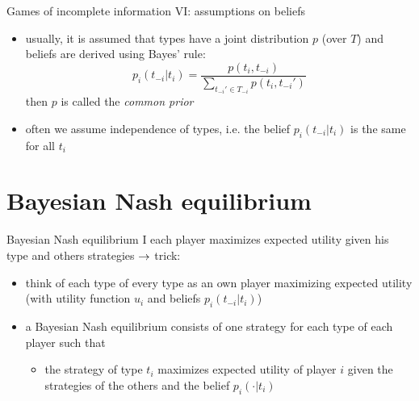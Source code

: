 \documentclass[bigger]{beamer}
\begin{document}
\begin{frame}[label={sec:org6bf1273}]{Games of incomplete information VI: assumptions on beliefs}
\begin{itemize}
\item usually, it is assumed that types have a joint distribution \(p\) (over \(T\)) and beliefs are derived using Bayes' rule:
$$p_i(t_{-i}|t_i)=\frac{p(t_i,t_{-i})}{\sum_{t_{-i}'\in T_{-i}}p(t_i,t_{-i}')}$$
then \(p\) is called the \emph{common prior}
\item often we assume independence of types, i.e. the belief \(p_i(t_{-i}|t_i)\) is the same for all \(t_i\)
\end{itemize}
\end{frame}
\section{Bayesian Nash equilibrium}
\label{sec:org32bb812}

\begin{frame}[label={sec:org04c1035}]{Bayesian Nash equilibrium I}
each player maximizes expected utility given his type and others strategies\linebreak
\(\rightarrow\) trick:
\begin{itemize}
\item think of each type of every type as an own player maximizing expected utility (with utility function \(u_i\) and beliefs \(p_i(t_{-i}|t_i)\))
\item a Bayesian Nash equilibrium consists of one strategy for each type of each player such that
\begin{itemize}
\item the strategy of type \(t_i\) maximizes expected utility of player \(i\) given the strategies of the others and the belief \(p_i(\cdot|t_i)\)
\end{itemize}
\end{itemize}
\end{frame}
\end{document}
